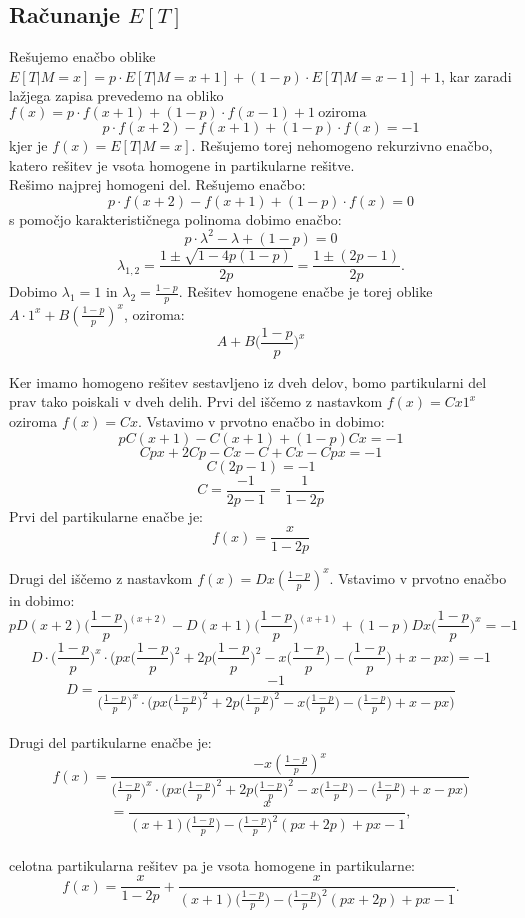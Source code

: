 \documentclass[12pt, a4paper]{article}
\begin{document}
\subsection{Računanje $E[T]$}

Rešujemo enačbo oblike $E[T|M=x] = p\cdot E[T|M=x+1] + (1-p)\cdot E[T|M=x-1] + 1$, kar zaradi lažjega zapisa prevedemo na obliko $f(x) = p\cdot f(x+1) + (1-p) \cdot f(x-1) + 1 ~ \textrm{oziroma} $ $$p\cdot f(x+2) - f(x+1) + (1-p)\cdot f(x) = -1$$ kjer je $f(x)=E[T|M=x]$. Rešujemo torej nehomogeno rekurzivno enačbo, katero rešitev je vsota homogene in partikularne rešitve. 
\\
Rešimo najprej homogeni del. Rešujemo enačbo: $$p\cdot f(x+2) - f(x+1) + (1-p)\cdot f(x) = 0$$ s pomočjo karakterističnega polinoma dobimo enačbo: $$p\cdot  \lambda ^2 - \lambda + (1-p) = 0$$ $$\lambda _{1, 2}= \frac{1 \pm \sqrt{1 - 4p(1-p)}}{2p} = \frac{1 \pm (2p-1)}{2p}.$$
Dobimo $\lambda _{1} = 1$ in $\lambda _{2} = \frac{1-p}{p}$. Rešitev homogene enačbe je torej oblike $A\cdot 1^x + B(\frac{1-p}{p})^x$, oziroma: $$A+ B \bigg( \frac{1-p}{p} \bigg )^x$$

Ker imamo homogeno rešitev sestavljeno iz dveh delov, bomo partikularni del prav tako poiskali v dveh delih. Prvi del iščemo z nastavkom $f(x)= Cx1^x$ oziroma $f(x)= Cx$. Vstavimo v prvotno enačbo in dobimo: $$pC(x+1)-C(x+1)+(1-p)Cx=-1$$ $$Cpx+2Cp-Cx-C+Cx-Cpx=-1$$ $$C(2p-1)=-1$$ $$C=\frac{-1}{2p-1} = \frac{1}{1-2p}$$ Prvi del partikularne enačbe je: $$f(x)=\frac{x}{1-2p}$$

Drugi del iščemo z nastavkom $f(x) = D x (\frac{1-p}{p})^x$. Vstavimo v prvotno enačbo in dobimo:
$$pD(x+2)\bigg( \frac{1-p}{p} \bigg )^{(x+2)} - D(x+1)\bigg( \frac{1-p}{p} \bigg )^{(x+1 )}+(1-p)Dx\bigg( \frac{1-p}{p} \bigg )^x = -1$$ 
$$D \cdot \bigg( \frac{1-p}{p} \bigg )^x \cdot \bigg( px\bigg( \frac{1-p}{p} \bigg )^2 + 2p\bigg( \frac{1-p}{p} \bigg )^2 -x\bigg( \frac{1-p}{p} \bigg )-\bigg( \frac{1-p}{p} \bigg )+x-px \bigg )= -1$$ 
$$D = \frac{-1}{\big( \frac{1-p}{p} \big )^x \cdot \big( px\big( \frac{1-p}{p} \big )^2 + 2p\big( \frac{1-p}{p} \big )^2 -x\big( \frac{1-p}{p} \big )-\big( \frac{1-p}{p} \big )+x-px \big )}$$ 
\\
Drugi del partikularne enačbe je: $$f(x) = \frac{-x  (\frac{1-p}{p})^x}{\big( \frac{1-p}{p} \big )^x \cdot \big( px\big( \frac{1-p}{p} \big )^2 + 2p\big( \frac{1-p}{p} \big )^2 -x\big( \frac{1-p}{p} \big )-\big( \frac{1-p}{p} \big )+x-px \big )}$$ $$= \frac{x}{(x+1)\big( \frac{1-p}{p} \big )-\big( \frac{1-p}{p} \big )^2(px+2p)+px-1},$$\\
celotna partikularna rešitev pa je vsota homogene in partikularne: $$f(x)=\frac{x}{1-2p}+\frac{x}{(x+1)\big( \frac{1-p}{p} \big )-\big( \frac{1-p}{p} \big )^2(px+2p)+px-1}.$$\\
\end{document}

